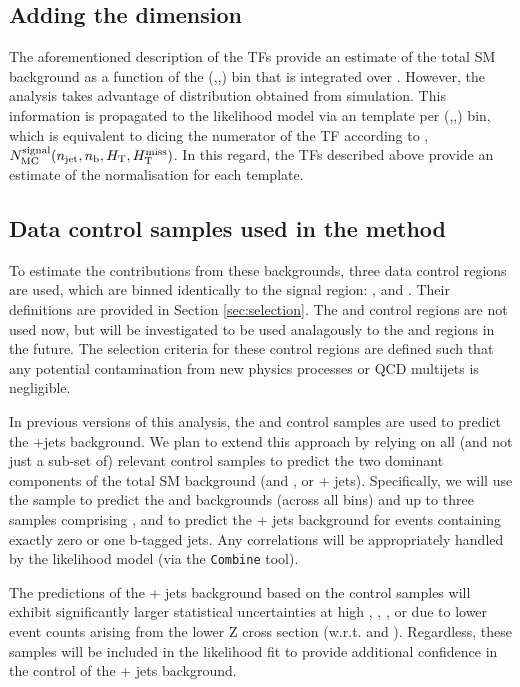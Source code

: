 \clearpage

\subsection{Adding the \mht dimension}

The aforementioned description of the TFs provide an estimate of the
total SM background as a function of the (\njet,\nb,\HT) bin that is
integrated over \mht. However, the analysis takes advantage of \mht
distribution obtained from simulation. This information is propagated
to the likelihood model via an \mht template per (\njet,\nb,\HT) bin,
which is equivalent to dicing the numerator of the TF according to
\mht, \ie $N_{\rm MC}^{\rm signal}(n_{\text{jet}},n_{\text{b}},\mbox{$H_\text{T}$},\mbox{$H_{\rm T}^{\rm miss}$})$. In this
regard, the TFs described above provide an estimate of the
normalisation for each \mht template.

\subsection{Data control samples used in the method}

To estimate the contributions from these backgrounds, three data
control regions are used, which are binned identically to the signal
region: \mj, \mmj and \gj.  Their definitions are provided
in Section \ref{sec:selection}. The \ej and \eej control regions are not
used now, but will be investigated to be used analagously to the \mj and \mmj regions in
the future. The selection criteria for these
control regions are defined such that any potential contamination from
new physics processes or QCD multijets is negligible.

In previous versions of this analysis, the \mmj and \gj control
samples are used to predict the \znunu +jets background. We plan to
extend this approach by relying on all (and not just a sub-set of)
relevant control samples to predict the two dominant components of the
total SM background (\wj and \ttbar, or \znunu + jets). Specifically,
we will use the \mj sample to predict the \wj and \ttbar backgrounds
(across all \nb bins) and up to three samples comprising \zmmj,
\gj and \wmj to predict the \znunu + jets background for events
containing exactly zero or one b-tagged jets. Any correlations will be
appropriately handled by the likelihood model (via the
\texttt{Combine} tool).

The predictions of the \znunu + jets background based on the \zmmj
control samples will exhibit significantly larger statistical
uncertainties at high \njet, \nb, \scalht, or \mht due to lower event
counts arising from the lower Z cross section (w.r.t. \gj and
\wj). Regardless, these samples will be included in the likelihood fit
to provide additional confidence in the control of the \znunu + jets
background.

